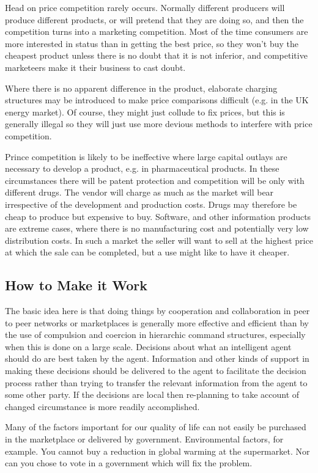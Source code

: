 Head on price competition rarely occurs.
Normally different producers will produce different products, or will pretend that they are doing so, and then the competition turns into a marketing competition.
Most of the time consumers are more interested in status than in getting the best price, so they won't buy the cheapest product unless there is no doubt that it is not inferior, and competitive marketeers make it their business to cast doubt.

Where there is no apparent difference in the product, elaborate charging structures may be introduced to make price comparisons difficult (e.g. in the UK energy market).
Of course, they might just collude to fix prices, but this is generally illegal so they will just use more devious methods to interfere with price competition.

Prince competition is likely to be ineffective where large capital outlays are necessary to develop a product, e.g. in pharmaceutical products.
In these circumstances there will be patent protection and competition will be only with different drugs.
The vendor will charge as much as the market will bear irrespective of the development and production costs.
Drugs may therefore be cheap to produce but expensive to buy.
Software, and other information products are extreme cases, where there is no manufacturing cost and potentially very low distribution costs.
In such a market the seller will want to sell at the highest price at which the sale can be completed, but a use might like to have it cheaper.

\subsection{How to Make it Work}

The basic idea here is that doing things by cooperation and collaboration in peer to peer networks or marketplaces is generally more effective and efficient than by the use of compulsion and coercion in hierarchic command structures, especially when this is done on a large scale.
Decisions about what an intelligent agent should do are best taken by the agent.
Information and other kinds of support in making these decisions should be delivered to the agent to facilitate the decision process rather than trying to transfer the relevant information from the agent to some other party.
If the decisions are local then re-planning to take account of changed circumstance is more readily accomplished.

Many of the factors important for our quality of life can not easily be purchased in the marketplace or delivered by government.
Environmental factors, for example.
You cannot buy a reduction in global warming at the supermarket.
Nor can you chose to vote in a government which will fix the problem.

